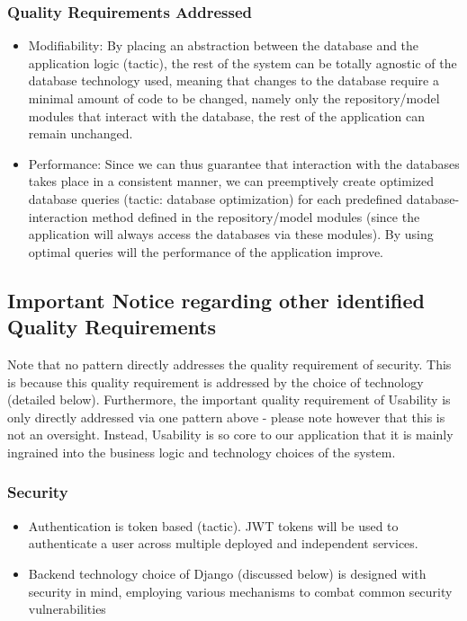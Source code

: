 \documentclass[12pt]{article}
\begin{document}
\subsubsection{Quality Requirements Addressed}
\begin{itemize}
    \item Modifiability: By placing an abstraction between the database and the application logic (tactic), the rest of the system can be totally agnostic of the database technology used, meaning that changes to the database require a minimal amount of code to be changed, namely only the repository/model modules that interact with the database, the rest of the application can remain unchanged.
    \item Performance: Since we can thus guarantee that interaction with the databases takes place in a consistent manner, we can preemptively create optimized database queries (tactic: database optimization) for each predefined database-interaction method defined in the repository/model modules (since the application will always access the databases via these modules). By using optimal queries will the performance of the application improve.
\end{itemize}
\subsection{Important Notice regarding other identified Quality Requirements}
Note that no pattern directly addresses the quality requirement of security. This is because this quality requirement is addressed by the choice of technology (detailed below). Furthermore, the important quality requirement of Usability is only directly addressed via one pattern above - please note however that this is not an oversight. Instead, Usability is so core to our application that it is mainly ingrained into the business logic and technology choices of the system.
\subsubsection{Security}
\begin{itemize}
    \item Authentication is token based (tactic). JWT tokens will be used to authenticate a user across multiple deployed and independent services.
    \item Backend technology choice of Django (discussed below) is designed with security in mind, employing various mechanisms to combat common security vulnerabilities
\end{itemize}
\end{document}
